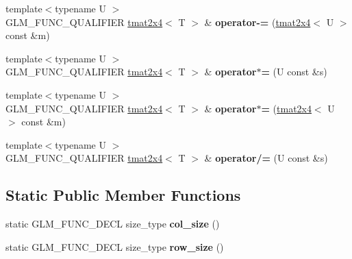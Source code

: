 \begin{DoxyCompactItemize}
\item 
\hypertarget{structglm_1_1detail_1_1tmat2x4_aab47a3bca1d894ee96bae1c783ce03bf}{{\footnotesize template$<$typename U $>$ }\\G\-L\-M\-\_\-\-F\-U\-N\-C\-\_\-\-Q\-U\-A\-L\-I\-F\-I\-E\-R \hyperlink{structglm_1_1detail_1_1tmat2x4}{tmat2x4}$<$ T $>$ \& {\bfseries operator-\/=} (\hyperlink{structglm_1_1detail_1_1tmat2x4}{tmat2x4}$<$ U $>$ const \&m)}\label{structglm_1_1detail_1_1tmat2x4_aab47a3bca1d894ee96bae1c783ce03bf}

\item 
\hypertarget{structglm_1_1detail_1_1tmat2x4_a5c7b042dbf2b36f6b36eaa070b9a7fbf}{{\footnotesize template$<$typename U $>$ }\\G\-L\-M\-\_\-\-F\-U\-N\-C\-\_\-\-Q\-U\-A\-L\-I\-F\-I\-E\-R \hyperlink{structglm_1_1detail_1_1tmat2x4}{tmat2x4}$<$ T $>$ \& {\bfseries operator$\ast$=} (U const \&s)}\label{structglm_1_1detail_1_1tmat2x4_a5c7b042dbf2b36f6b36eaa070b9a7fbf}

\item 
\hypertarget{structglm_1_1detail_1_1tmat2x4_ac2810d6186ceb53924f74eecfac80a4e}{{\footnotesize template$<$typename U $>$ }\\G\-L\-M\-\_\-\-F\-U\-N\-C\-\_\-\-Q\-U\-A\-L\-I\-F\-I\-E\-R \hyperlink{structglm_1_1detail_1_1tmat2x4}{tmat2x4}$<$ T $>$ \& {\bfseries operator$\ast$=} (\hyperlink{structglm_1_1detail_1_1tmat2x4}{tmat2x4}$<$ U $>$ const \&m)}\label{structglm_1_1detail_1_1tmat2x4_ac2810d6186ceb53924f74eecfac80a4e}

\item 
\hypertarget{structglm_1_1detail_1_1tmat2x4_ad198d56e4a45d6294d8c3edaf9c9e49b}{{\footnotesize template$<$typename U $>$ }\\G\-L\-M\-\_\-\-F\-U\-N\-C\-\_\-\-Q\-U\-A\-L\-I\-F\-I\-E\-R \hyperlink{structglm_1_1detail_1_1tmat2x4}{tmat2x4}$<$ T $>$ \& {\bfseries operator/=} (U const \&s)}\label{structglm_1_1detail_1_1tmat2x4_ad198d56e4a45d6294d8c3edaf9c9e49b}

\end{DoxyCompactItemize}
\subsection*{Static Public Member Functions}
\begin{DoxyCompactItemize}
\item 
\hypertarget{structglm_1_1detail_1_1tmat2x4_a5ed23bf77b036f85b30c034fb168d967}{static G\-L\-M\-\_\-\-F\-U\-N\-C\-\_\-\-D\-E\-C\-L size\-\_\-type {\bfseries col\-\_\-size} ()}\label{structglm_1_1detail_1_1tmat2x4_a5ed23bf77b036f85b30c034fb168d967}

\item 
\hypertarget{structglm_1_1detail_1_1tmat2x4_a58e10cf43d601b15d3e76b310d3c6d86}{static G\-L\-M\-\_\-\-F\-U\-N\-C\-\_\-\-D\-E\-C\-L size\-\_\-type {\bfseries row\-\_\-size} ()}\label{structglm_1_1detail_1_1tmat2x4_a58e10cf43d601b15d3e76b310d3c6d86}

\end{DoxyCompactItemize}


